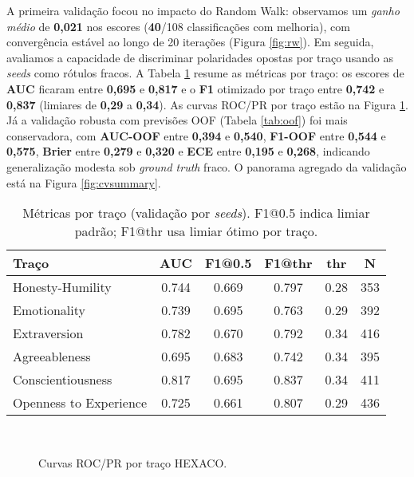 \documentclass[12pt]{article}
\begin{document}
A primeira validação focou no impacto do Random Walk: observamos um \textit{ganho médio} de \textbf{0,021} nos escores (\textbf{40}/108 classificações com melhoria), com convergência estável ao longo de 20 iterações (Figura \ref{fig:rw}). Em seguida, avaliamos a capacidade de discriminar polaridades opostas por traço usando as \textit{seeds} como rótulos fracos. A Tabela \ref{tab:validation} resume as métricas por traço: os escores de \textbf{AUC} ficaram entre \textbf{0,695} e \textbf{0,817} e o \textbf{F1} otimizado por traço entre \textbf{0,742} e \textbf{0,837} (limiares de \textbf{0,29} a \textbf{0,34}). As curvas ROC/PR por traço estão na Figura \ref{fig:rocpr}. Já a validação robusta com previsões OOF (Tabela \ref{tab:oof}) foi mais conservadora, com \textbf{AUC-OOF} entre \textbf{0,394} e \textbf{0,540}, \textbf{F1-OOF} entre \textbf{0,544} e \textbf{0,575}, \textbf{Brier} entre \textbf{0,279} e \textbf{0,320} e \textbf{ECE} entre \textbf{0,195} e \textbf{0,268}, indicando generalização modesta sob \textit{ground truth} fraco. O panorama agregado da validação está na Figura \ref{fig:cvsummary}.

\begin{table}[H]
\centering
\caption{Métricas por traço (validação por \textit{seeds}). F1@0.5 indica limiar padrão; F1@thr usa limiar ótimo por traço.}
\label{tab:validation}
\begin{tabular}{lccccc}
\hline
Traço & AUC & F1@0.5 & F1@thr & thr & N \\
\hline
Honesty-Humility & 0.744 & 0.669 & 0.797 & 0.28 & 353 \\
Emotionality & 0.739 & 0.695 & 0.763 & 0.29 & 392 \\
Extraversion & 0.782 & 0.670 & 0.792 & 0.34 & 416 \\
Agreeableness & 0.695 & 0.683 & 0.742 & 0.34 & 395 \\
Conscientiousness & 0.817 & 0.695 & 0.837 & 0.34 & 411 \\
Openness to Experience & 0.725 & 0.661 & 0.807 & 0.29 & 436 \\
\hline
\end{tabular}
\end{table}

\begin{figure}[H]
\centering
{}\hfill
{}\hfill
{}\\
\hfill
{}\hfill
{}
\caption{Curvas ROC/PR por traço HEXACO.}
\label{fig:rocpr}
\end{figure}
\end{document}
